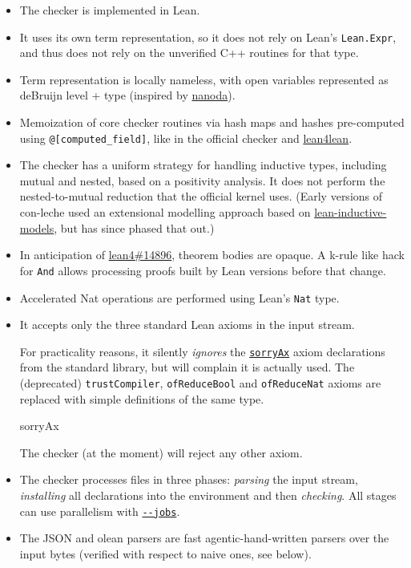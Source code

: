 \documentclass{article}
\newcommand\code[1]{\texttt{#1}}
\begin{document}
\begin{itemize}
\item The checker is implemented in Lean.
\item It uses its own term representation, so it does not rely on Lean’s \code{Lean.Expr}, and thus does not rely on the unverified C++ routines for that type.
\item Term representation is locally nameless, with open variables represented as deBruijn level + type (inspired by \href{https://github.com/ammkrn/nanoda_lib}{nanoda}).
\item Memoization of core checker routines via hash maps and hashes pre-computed using \code{@[computed\_field]}, like in the official checker and \href{https://github.com/digama0/lean4lean/}{lean4lean}.
\item The checker has a uniform strategy for handling inductive types, including mutual and nested, based on a positivity analysis. It does not perform the nested-to-mutual reduction that the official kernel uses. (Early versions of con-leche used an extensional modelling approach based on \href{https://github.com/nomeata/lean-inductive-models}{lean-inductive-models}, but has since phased that out.)
\item In anticipation of \href{https://github.com/leanprover/lean4/pull/14896}{lean4\#14896}, theorem bodies are opaque. A k-rule like hack for \code{And} allows processing proofs built by Lean versions before that change.
\item Accelerated Nat operations are performed using Lean’s \code{Nat} type.
\item It accepts only the three standard Lean axioms in the input stream.

  For practicality reasons, it silently \emph{ignores} the \href{https://github.com/leanprover/con-leche/blob/master/ConLeche/Cached/ParsedC.lean#L236-L237}{\code{sorryAx}} axiom declarations from the standard library, but will complain it is actually used. The (deprecated) \code{trustCompiler}, \code{ofReduceBool} and \code{ofReduceNat} axioms are replaced with simple definitions of the same type.

\begin{leanblock}[view=lean, sum=vc-0rVPx4v]{sorryAx}{}
\end{leanblock}

  The checker (at the moment) will reject any other axiom.
\item The checker processes files in three phases: \emph{parsing} the input stream, \emph{installing} all declarations into the environment and then \emph{checking}. All stages can use parallelism with \href{https://github.com/leanprover/con-leche/blob/master/ConLeche/Driver/Cli.lean#L131}{\code{-{}-jobs}}.
\item The JSON and olean parsers are fast agentic-hand-written parsers over the input bytes (verified with respect to naive ones, see below).
\end{itemize}
\end{document}
